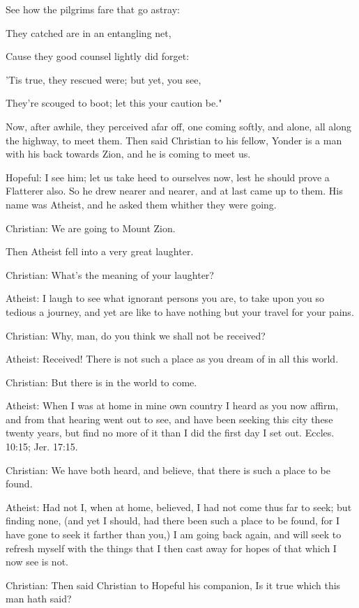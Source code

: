 See how the pilgrims fare that go astray:

They catched are in an entangling net,

Cause they good counsel lightly did forget:

'Tis true, they rescued were; but yet, you see,

They're scouged to boot; let this your caution be."

Now, after awhile, they perceived afar off, one coming softly, and
alone, all along the highway, to meet them. Then said Christian to his
fellow, Yonder is a man with his back towards Zion, and he is coming to
meet us.

Hopeful: I see him; let us take heed to ourselves now, lest he should
prove a Flatterer also. So he drew nearer and nearer, and at last came
up to them. His name was Atheist, and he asked them whither they were
going.

Christian: We are going to Mount Zion.

Then Atheist fell into a very great laughter.

Christian: What's the meaning of your laughter?

Atheist: I laugh to see what ignorant persons you are, to take upon you
so tedious a journey, and yet are like to have nothing but your travel
for your pains.

Christian: Why, man, do you think we shall not be received?

Atheist: Received! There is not such a place as you dream of in all
this world.

Christian: But there is in the world to come.

Atheist: When I was at home in mine own country I heard as you now
affirm, and from that hearing went out to see, and have been seeking
this city these twenty years, but find no more of it than I did the
first day I set out. Eccles. 10:15; Jer. 17:15.

Christian: We have both heard, and believe, that there is such a place
to be found.

Atheist: Had not I, when at home, believed, I had not come thus far to
seek; but finding none, (and yet I should, had there been such a place
to be found, for I have gone to seek it farther than you,) I am going
back again, and will seek to refresh myself with the things that I then
cast away for hopes of that which I now see is not.

Christian: Then said Christian to Hopeful his companion, Is it true
which this man hath said?

